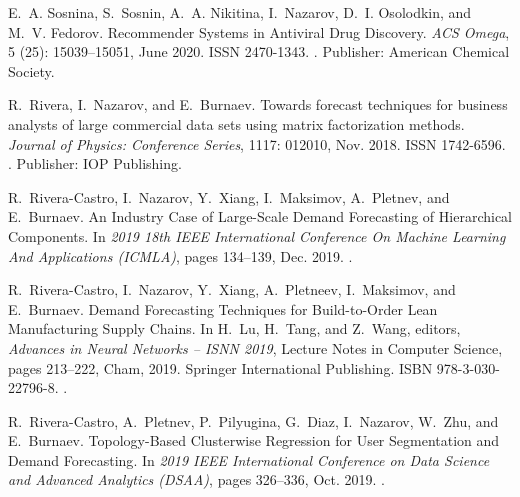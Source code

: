 \documentclass{resume} %
\begin{document}
{\begin{thebibliography}{10}
E.~A. Sosnina, S.~Sosnin, A.~A. Nikitina, I.~Nazarov, D.~I. Osolodkin, and
  M.~V. Fedorov.
\newblock Recommender {Systems} in {Antiviral} {Drug} {Discovery}.
\newblock \emph{ACS Omega}, 5 (25): 15039--15051, June 2020.
\newblock ISSN 2470-1343.
\newblock {}.
\newblock Publisher: American Chemical Society.

R.~Rivera, I.~Nazarov, and E.~Burnaev.
\newblock Towards forecast techniques for business analysts of large commercial
  data sets using matrix factorization methods.
\newblock \emph{Journal of Physics: Conference Series}, 1117: 012010,
  Nov. 2018.
\newblock ISSN 1742-6596.
\newblock {}.
\newblock Publisher: IOP Publishing.

R.~Rivera-Castro, I.~Nazarov, Y.~Xiang, I.~Maksimov, A.~Pletnev, and
  E.~Burnaev.
\newblock An {Industry} {Case} of {Large}-{Scale} {Demand} {Forecasting} of
  {Hierarchical} {Components}.
\newblock In \emph{2019 18th {IEEE} {International} {Conference} {On} {Machine}
  {Learning} {And} {Applications} ({ICMLA})}, pages 134--139, Dec.
  2019{}.
\newblock {}.

R.~Rivera-Castro, I.~Nazarov, Y.~Xiang, A.~Pletneev, I.~Maksimov, and
  E.~Burnaev.
\newblock Demand {Forecasting} {Techniques} for {Build}-to-{Order} {Lean}
  {Manufacturing} {Supply} {Chains}.
\newblock In H.~Lu, H.~Tang, and Z.~Wang, editors, \emph{Advances in {Neural}
  {Networks} – {ISNN} 2019}, Lecture {Notes} in {Computer} {Science}, pages
  213--222, Cham, 2019{}. Springer International Publishing.
\newblock ISBN 978-3-030-22796-8.
\newblock {}.

R.~Rivera-Castro, A.~Pletnev, P.~Pilyugina, G.~Diaz, I.~Nazarov, W.~Zhu, and
  E.~Burnaev.
\newblock Topology-{Based} {Clusterwise} {Regression} for {User} {Segmentation}
  and {Demand} {Forecasting}.
\newblock In \emph{2019 {IEEE} {International} {Conference} on {Data} {Science}
  and {Advanced} {Analytics} ({DSAA})}, pages 326--336, Oct.
  2019{}.
\newblock {}.


\end{thebibliography}}
\end{document}
